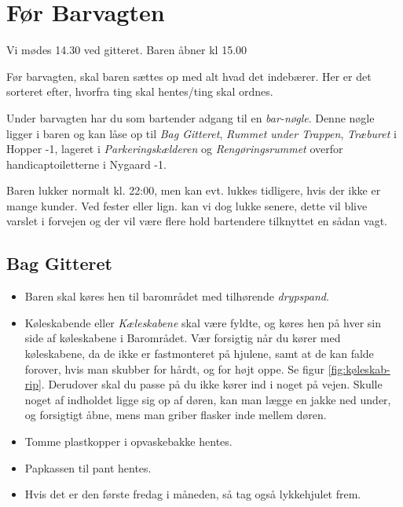 \section{Før Barvagten}
\label{sec:pre-barvagten}

Vi mødes 14.30 ved gitteret. Baren åbner kl 15.00

Før barvagten, skal baren sættes op med alt hvad det indebærer. Her er
det sorteret efter, hvorfra ting skal hentes/ting skal ordnes.

Under barvagten har du som bartender adgang til en \textit{bar-nøgle}. 
Denne nøgle ligger i baren og kan låse op til \textit{Bag Gitteret}, 
\textit{Rummet under Trappen}, \textit{Træburet} i Hopper -1, 
lageret i \textit{Parkeringskælderen} og 
\textit{Rengøringsrummet} overfor handicaptoiletterne i Nygaard -1.

Baren lukker normalt kl. 22:00, men kan evt. lukkes tidligere, hvis der ikke er mange kunder.
Ved fester eller lign. kan vi dog lukke senere, dette vil blive varslet i forvejen og der vil 
være flere hold bartendere tilknyttet en sådan vagt.

\subsection{Bag Gitteret}
\label{sec:pre:bag-ved-gitteret}

\begin{itemize}
	\item Baren skal køres hen til barområdet med tilhørende \textit{drypspand}.
	\item Køleskabende eller \textit{Kæleskabene} skal være fyldte, og køres hen på hver sin side af køleskabene i 
	Barområdet. Vær forsigtig når du kører med køleskabene, da de ikke er fastmonteret på hjulene, 
	samt at de kan falde forover, hvis man skubber for hårdt, og for højt oppe. Se figur \ref{fig:køleskab-rip}. Derudover skal
	du passe på du ikke kører ind i noget på vejen. Skulle noget af indholdet ligge sig op af døren, kan man lægge en jakke
	ned under, og forsigtigt åbne, mens man griber flasker inde mellem døren.
	\item Tomme plastkopper i opvaskebakke hentes.
	\item Papkassen til pant hentes.
	\item Hvis det er den første fredag i måneden, så tag også lykkehjulet frem.
\end{itemize}

